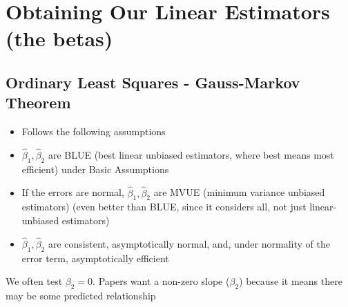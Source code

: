 \documentclass[10pt, oneside]{article}
\begin{document}
\section{Obtaining Our Linear Estimators (the betas)}

\subsection{Ordinary Least Squares - Gauss-Markov Theorem}
\begin{itemize}
    \item Follows the following assumptions
    \item $\hat \beta_1, \hat \beta_2$ are BLUE (best linear unbiased estimators, where best means most efficient) under Basic Assumptions
    \item If the errors are normal, $\hat \beta_1, \hat \beta_2$ are MVUE (minimum variance unbiased estimators) (even better than BLUE, since it considers all, not just linear-unbiased estimators)
    \item $\hat \beta_1, \hat \beta_2$ are consistent, asymptotically normal, and, under normality of the error term, asymptotically efficient
\end{itemize}

We often test $\beta_2 = 0$. Papers want a non-zero slope ($\beta_2$) because it means there may be some predicted relationship
\end{document}
